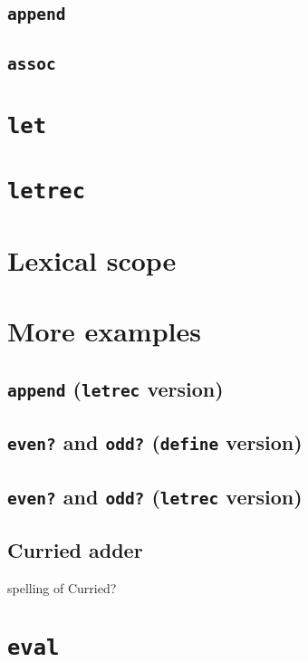 \documentclass{book}
\begin{document}
\subsection{\texttt{append}}

\subsection{\texttt{assoc}}

\section{\texttt{let}}

\section{\texttt{letrec}}

\section{Lexical scope}

\section{More examples}

\subsection{\texttt{append} (\texttt{letrec} version)}

\subsection{\texttt{even?} and \texttt{odd?} (\texttt{define} version)}

\subsection{\texttt{even?} and \texttt{odd?} (\texttt{letrec} version)}

\subsection{Curried adder}

spelling of Curried?

\section{\texttt{eval}}
\end{document}
